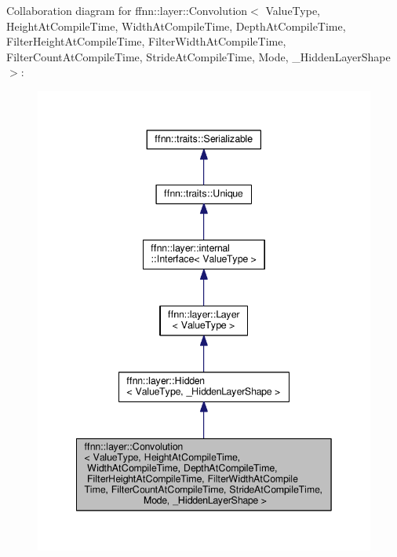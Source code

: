 Collaboration diagram for ffnn\-:\-:layer\-:\-:Convolution$<$ Value\-Type, Height\-At\-Compile\-Time, Width\-At\-Compile\-Time, Depth\-At\-Compile\-Time, Filter\-Height\-At\-Compile\-Time, Filter\-Width\-At\-Compile\-Time, Filter\-Count\-At\-Compile\-Time, Stride\-At\-Compile\-Time, Mode, \-\_\-\-Hidden\-Layer\-Shape $>$\-:
\nopagebreak
\begin{figure}[H]
\begin{center}
\leavevmode
\includegraphics[width=342pt]{classffnn_1_1layer_1_1_convolution__coll__graph}
\end{center}
\end{figure}
